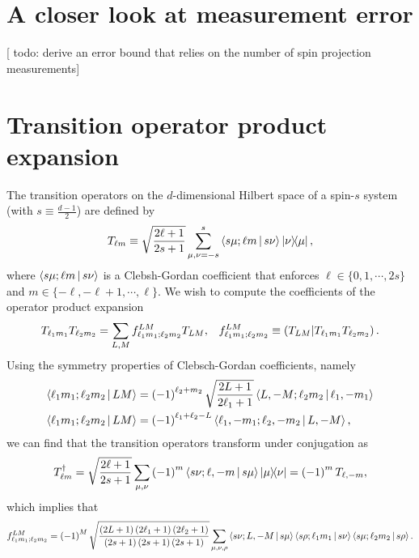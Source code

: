 \documentclass[notitlepage,twocolumn]{revtex4-2}
\newcommand{\f}[2]{\dfrac{#1}{#2}} %
\newcommand{\p}[1]{\left(#1\right)} %
\renewcommand{\set}[1]{\{#1\}} %
\newcommand{\bk}{\Braket} %
\newcommand{\1}{\mathds{1}}
\def\obk#1{\mathinner{({#1})}}
\newcommand{\red}[1]{{\color{red} #1}}
\begin{document}
\section{A closer look at measurement error}
\label{sec:error}

[\red{todo: derive an error bound that relies on the number of spin projection measurements}]

\section{Transition operator product expansion}
\label{sec:trans_prod}

The transition operators on the $d$-dimensional Hilbert space of a spin-$s$ system (with $s\equiv\frac{d-1}{2}$) are defined by
\begin{align}
  T_{\ell m} \equiv \sqrt{\f{2\ell+1}{2s+1}} \sum_{\mu,\nu=-s}^s
  \bk{s\mu;\ell m|s\nu} \op{\nu}{\mu},
\end{align}
where $\bk{s\mu;\ell m|s\nu}$ is a Clebsh-Gordan coefficient that enforces $\ell\in\set{0,1,\cdots,2s}$ and $m\in\set{-\ell,-\ell+1,\cdots,\ell}$.
We wish to compute the coefficients of the operator product expansion
\begin{align}
  T_{\ell_1 m_1} T_{\ell_2 m_2}
  = \sum_{L,M} f_{\ell_1 m_1;\ell_2 m_2}^{LM} T_{LM},
  &&
  f_{\ell_1 m_1;\ell_2 m_2}^{LM}
  \equiv \obk{T_{LM} | T_{\ell_1 m_1} T_{\ell_2 m_2}}.
\end{align}
Using the symmetry properties of Clebsch-Gordan coefficients, namely
\begin{align}
  \bk{\ell_1 m_1; \ell_2 m_2| L M}
  &= \p{-1}^{\ell_2+m_2} \sqrt{\f{2L+1}{2\ell_1+1}}
  \bk{L,-M; \ell_2 m_2| \ell_1,-m_1} \\
  \bk{\ell_1 m_1; \ell_2 m_2| L M}
  &= \p{-1}^{\ell_1+\ell_2-L}
  \bk{\ell_1,-m_1; \ell_2,-m_2| L,-M},
\end{align}
we can find that the transition operators transform under conjugation as
\begin{align}
  T_{\ell m}^\dag
  = \sqrt{\f{2\ell+1}{2s+1}}
  \sum_{\mu,\nu} \p{-1}^m \bk{s\nu;\ell,-m|s\mu} \op{\mu}{\nu}
  = \p{-1}^m T_{\ell,-m},
\end{align}
which implies that
\begin{align}
  f_{\ell_1 m_1;\ell_2 m_2}^{LM}
  = \p{-1}^M \sqrt{\f{\p{2L+1}\p{2\ell_1+1}\p{2\ell_2+1}}
    {\p{2s+1}\p{2s+1}\p{2s+1}}}
  \sum_{\mu,\nu,\rho} \bk{s\nu;L,-M|s\mu}
  \bk{s\rho;\ell_1m_1|s\nu} \bk{s\mu;\ell_2m_2|s\rho}.
\end{align}
\end{document}
